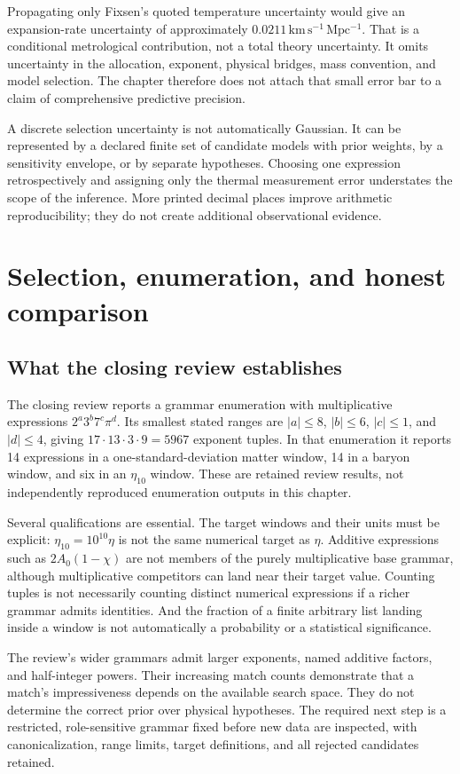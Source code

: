 Propagating only Fixsen's quoted temperature uncertainty would give an expansion-rate uncertainty of approximately $0.0211\,\mathrm{km\,s^{-1}\,Mpc^{-1}}$. That is a conditional metrological contribution, not a total theory uncertainty. It omits uncertainty in the allocation, exponent, physical bridges, mass convention, and model selection. The chapter therefore does not attach that small error bar to a claim of comprehensive predictive precision.

A discrete selection uncertainty is not automatically Gaussian. It can be represented by a declared finite set of candidate models with prior weights, by a sensitivity envelope, or by separate hypotheses. Choosing one expression retrospectively and assigning only the thermal measurement error understates the scope of the inference. More printed decimal places improve arithmetic reproducibility; they do not create additional observational evidence.

\section{Selection, enumeration, and honest comparison}
\subsection{What the closing review establishes}
The closing review reports a grammar enumeration with multiplicative expressions $2^a3^b7^c\pi^d$. Its smallest stated ranges are $|a|\le8$, $|b|\le6$, $|c|\le1$, and $|d|\le4$, giving $17\cdot13\cdot3\cdot9=5967$ exponent tuples. In that enumeration it reports 14 expressions in a one-standard-deviation matter window, 14 in a baryon window, and six in an $\eta_{10}$ window. These are retained review results, not independently reproduced enumeration outputs in this chapter.

Several qualifications are essential. The target windows and their units must be explicit: $\eta_{10}=10^{10}\eta$ is not the same numerical target as $\eta$. Additive expressions such as $2A_0(1-\chi)$ are not members of the purely multiplicative base grammar, although multiplicative competitors can land near their target value. Counting tuples is not necessarily counting distinct numerical expressions if a richer grammar admits identities. And the fraction of a finite arbitrary list landing inside a window is not automatically a probability or a statistical significance.

The review's wider grammars admit larger exponents, named additive factors, and half-integer powers. Their increasing match counts demonstrate that a match's impressiveness depends on the available search space. They do not determine the correct prior over physical hypotheses. The required next step is a restricted, role-sensitive grammar fixed before new data are inspected, with canonicalization, range limits, target definitions, and all rejected candidates retained.

